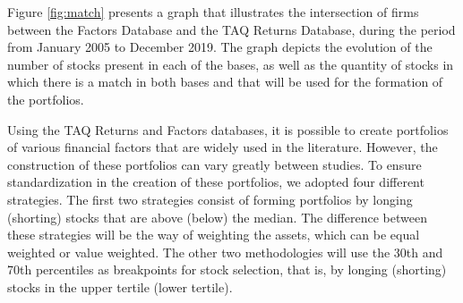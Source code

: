 Figure \ref{fig:match} presents a graph that illustrates the intersection of firms between the Factors Database and the TAQ Returns Database, during the period from January 2005 to December 2019. The graph depicts the evolution of the number of stocks present in each of the bases, as well as the quantity of stocks in which there is a match in both bases and that will be used for the formation of the portfolios.

Using the TAQ Returns and Factors databases, it is possible to create portfolios of various financial factors that are widely used in the literature. However, the construction of these portfolios can vary greatly between studies. To ensure standardization in the creation of these portfolios, we adopted four different strategies. The first two strategies consist of forming portfolios by longing (shorting) stocks that are above (below) the median. The difference between these strategies will be the way of weighting the assets, which can be equal weighted or value weighted. The other two methodologies will use the 30th and 70th percentiles as breakpoints for stock selection, that is, by longing (shorting) stocks in the upper tertile (lower tertile).



